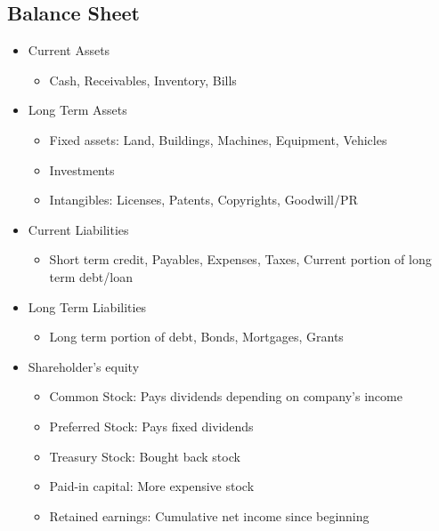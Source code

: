\documentclass[landscape, letterpaper, 10pt]{article}
\begin{document}
\begin{multicols}{3}
    \subsection*{Balance Sheet}
    \begin{itemize}
        \itemsep0em
        \item Current Assets
              \begin{itemize}
                  \item Cash, Receivables, Inventory, Bills
              \end{itemize}
        \item Long Term Assets
              \begin{itemize}
                  \item Fixed assets: Land, Buildings, Machines, Equipment, Vehicles
                  \item Investments
                  \item Intangibles: Licenses, Patents, Copyrights, Goodwill/PR
              \end{itemize}
        \item Current Liabilities
              \begin{itemize}
                  \item Short term credit, Payables, Expenses, Taxes, Current portion of long term debt/loan
              \end{itemize}
        \item Long Term Liabilities
              \begin{itemize}
                  \item Long term portion of debt, Bonds, Mortgages, Grants
              \end{itemize}
        \item Shareholder's equity
              \begin{itemize}
                  \item Common Stock: Pays dividends depending on company's income
                  \item Preferred Stock: Pays fixed dividends
                  \item Treasury Stock: Bought back stock
                  \item Paid-in capital: More expensive stock
                  \item Retained earnings: Cumulative net income since beginning
              \end{itemize}
    \end{itemize}

\end{multicols}
\end{document}
